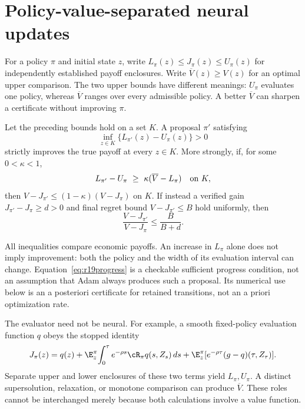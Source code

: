 \section{Policy-value-separated neural updates}\label{sec:r19policy}
For a policy $\pi$ and initial state $z$, write $L_\pi(z)\leq J_\pi(z)\leq U_\pi(z)$ for independently established payoff enclosures. Write $\overline V(z)\geq V(z)$ for an optimal upper comparison. The two upper bounds have different meanings: $U_\pi$ evaluates one policy, whereas $\overline V$ ranges over every admissible policy. A better $\overline V$ can sharpen a certificate without improving $\pi$.

\begin{proposition}\label{prop:r19accept}
Let the preceding bounds hold on a set $K$. A proposal $\pi'$ satisfying
\begin{equation}
 \inf_{z\in K}\{L_{\pi'}(z)-U_\pi(z)\}>0
 \label{eq:r19accept}
\end{equation}
strictly improves the true payoff at every $z\in K$. More strongly, if, for some $0<\kappa<1$,
\begin{equation}
 L_{\pi'}-U_\pi\ \geq\ \kappa(\overline V-L_\pi)
 \quad\hbox{on }K,
 \label{eq:r19progress}
\end{equation}
then $V-J_{\pi'}\leq(1-\kappa)(V-J_\pi)$ on $K$. If instead a verified gain $J_{\pi'}-J_\pi\geq d>0$ and final regret bound $V-J_{\pi'}\leq B$ hold uniformly, then
\begin{equation}
 \frac{V-J_{\pi'}}{V-J_\pi}\leq\frac{B}{B+d}.
 \label{eq:r19ratio}
\end{equation}
\end{proposition}
All inequalities compare economic payoffs. An increase in $L_\pi$ alone does not imply improvement: both the policy and the width of its evaluation interval can change. Equation~\eqref{eq:r19progress} is a checkable sufficient progress condition, not an assumption that Adam always produces such a proposal. Its numerical use below is an a posteriori certificate for retained transitions, not an a priori optimization rate.

The evaluator need not be neural. For example, a smooth fixed-policy evaluation function $q$ obeys the stopped identity
\[
 J_\pi(z)=q(z)+\E_z^\pi\!\int_0^\tau e^{-\rho s}\cR_\pi q(s,Z_s)\,ds
       +\E_z^\pi[e^{-\rho\tau}(g-q)(\tau,Z_\tau)].
\]
Separate upper and lower enclosures of these two terms yield $L_\pi,U_\pi$. A distinct supersolution, relaxation, or monotone comparison can produce $\overline V$. These roles cannot be interchanged merely because both calculations involve a value function.


